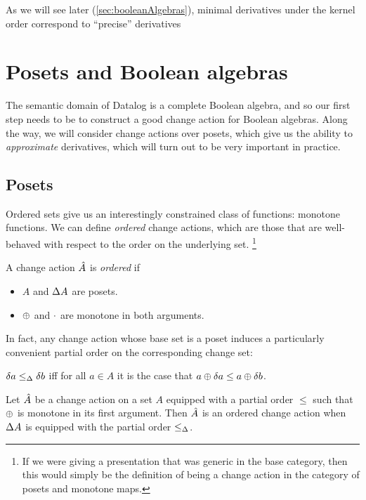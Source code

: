 As we will see later (\cref{sec:booleanAlgebras}), minimal derivatives under
the kernel order correspond to ``precise'' derivatives

\section{Posets and Boolean algebras}
\label{sec:moreStructures}


The semantic domain of Datalog is a complete Boolean algebra, and so our first step needs
to be to construct a good change action for Boolean algebras. Along the way, we
will consider change actions over posets, which give us the ability to
\emph{approximate} derivatives, which will turn out to be very important in practice.

\subsection{Posets}

Ordered sets give us an interestingly constrained class of functions: monotone
functions. We can define \emph{ordered} change actions, which are those that
are well-behaved with respect to the order on the underlying set.
\footnote{If we were giving a presentation that was
generic in the base category, then this would simply be the definition of being
a change action in the category of posets and monotone maps.}

\begin{defn}
  A change action $\hat{A}$ is \emph{ordered} if
  \begin{itemize}
    \item $A$ and $\Delta A$ are posets.
    \item $\oplus$ and $\cdot$ are monotone in both arguments.
  \end{itemize}
\end{defn}

In fact, any change action whose base set is a poset induces a particularly convenient partial order
on the corresponding change set:

\begin{defn}
  $\delta a \leq_\Delta \delta b$ iff for all $a \in A$ it is the case that
  $a \oplus \delta a \leq a \oplus \delta b$.
\end{defn}

\begin{prop}
  Let $\hat{A}$ be a change action on a set $A$ equipped with a partial order $\leq$ such that
  $\oplus$ is monotone in its first argument. Then $\hat{A}$ is an ordered change action when
  $\Delta A$ is equipped with the partial order $\leq_\Delta$.
\end{prop}


